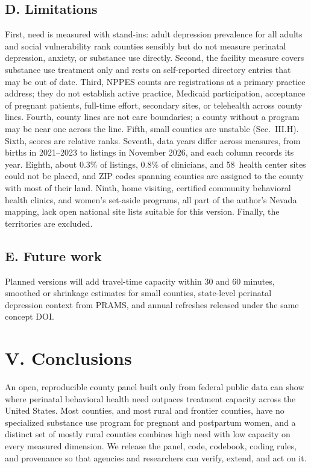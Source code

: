 \documentclass{article}
\begin{document}
\subsection*{D. Limitations}
First, need is measured with stand-ins: adult depression prevalence for all adults and social vulnerability rank counties sensibly but do not measure perinatal depression, anxiety, or substance use directly. Second, the facility measure covers substance use treatment only and rests on self-reported directory entries that may be out of date. Third, NPPES counts are registrations at a primary practice address; they do not establish active practice, Medicaid participation, acceptance of pregnant patients, full-time effort, secondary sites, or telehealth across county lines. Fourth, county lines are not care boundaries; a county without a program may be near one across the line. Fifth, small counties are unstable (Sec.~III.H). Sixth, scores are relative ranks. Seventh, data years differ across measures, from births in 2021--2023 to listings in November 2026, and each column records its year. Eighth, about 0.3\% of listings, 0.8\% of clinicians, and 58\ health center sites could not be placed, and ZIP codes spanning counties are assigned to the county with most of their land. Ninth, home visiting, certified community behavioral health clinics, and women's set-aside programs, all part of the author's Nevada mapping, lack open national site lists suitable for this version. Finally, the territories are excluded.

\subsection*{E. Future work}
Planned versions will add travel-time capacity within 30 and 60 minutes, smoothed or shrinkage estimates for small counties, state-level perinatal depression context from PRAMS, and annual refreshes released under the same concept DOI.

\section*{V. Conclusions}
An open, reproducible county panel built only from federal public data can show where perinatal behavioral health need outpaces treatment capacity across the United States. Most counties, and most rural and frontier counties, have no specialized substance use program for pregnant and postpartum women, and a distinct set of mostly rural counties combines high need with low capacity on every measured dimension. We release the panel, code, codebook, coding rules, and provenance so that agencies and researchers can verify, extend, and act on it.
\end{document}
